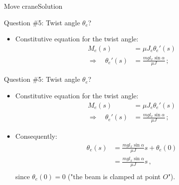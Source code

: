 \documentclass{beamer}
\newcommand{\imply}{\Rightarrow}
\newcommand{\xj}{x}
\newcommand*{\drotj}{\theta}
\newcommand*{\Mstaticj}{J}
\newcommand{\Mresj}{M}
\begin{document}
\begin{frame}{Move crane}{Solution}

\begin{overprint}

\vskip-20pt
\begin{exampleblock}{Question \#5: Twist angle $\drotj_e$?}
\begin{itemize}
\item Constitutive equation for the twist angle:
\begin{displaymath}
\begin{split}
\Mresj_e(s) &=\mu\Mstaticj_e\drotj_e'(s) \\
\imply\quad\drotj_e'(s) &=\frac{mgl_\xj\sin\alpha}{\mu J}\,;
\end{split}
\end{displaymath}
\end{itemize}
\end{exampleblock}

\vskip-20pt
\begin{exampleblock}{Question \#5: Twist angle $\drotj_e$?}
\begin{itemize}
\item Constitutive equation for the twist angle:
\begin{displaymath}
\begin{split}
\Mresj_e(s) &=\mu\Mstaticj_e\drotj_e'(s) \\
\imply\quad\drotj_e'(s) &=\frac{mgl_\xj\sin\alpha}{\mu J}\,;
\end{split}
\end{displaymath}
\item Consequently:
\begin{displaymath}
\begin{split}
\drotj_e(s) &=\frac{mgl_\xj\sin\alpha}{\mu J}s+\drotj_e(0) \\
&=\frac{mgl_\xj\sin\alpha}{\mu J}s\,, \\
\end{split}
\end{displaymath}
since $\drotj_e(0)=0$ ("the beam is clamped at point $O$").
\end{itemize}
\end{exampleblock}

\end{overprint}

\end{frame}
\end{document}
